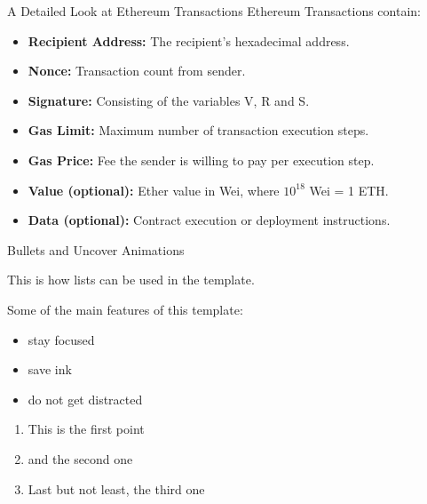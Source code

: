 \documentclass[handout]{beamer}
\begin{document}
\begin{frame}{A Detailed Look at Ethereum Transactions}
Ethereum Transactions contain:
	\begin{itemize}
		\item<1-> \textbf{Recipient Address:} The recipient's hexadecimal 		address.
		\item<2-> \textbf{Nonce:} Transaction count from sender.
		\item<3-> \textbf{Signature:} Consisting of the variables V, R and S.
		\item<4-> \textbf{Gas Limit:} Maximum number of transaction execution steps.
		\item<5-> \textbf{Gas Price:} Fee the sender is willing to pay per execution step. 
		\item<6-> \textbf{Value (optional):} Ether value in Wei, where $10^{18}$ Wei = 1 ETH. 
		\item<7-> \textbf{Data (optional):} Contract execution or deployment instructions.
	\end{itemize}

\end{frame}


















\begin{frame}{Bullets and Uncover Animations}

This is how lists can be used in the template. \\ \vspace{1em}

Some of the main features of this template:
	
	\begin{itemize}
		\item<1-> stay focused
		\item<2-> save ink
		\item<3-> do not get distracted
	\end{itemize}

	\vspace{1em}	

	\begin{enumerate}
		\item<5-> This is the first point
		\item<6-> and the second one
		\item<7-> Last but not least, the third one
	\end{enumerate}
	
\end{frame}
\end{document}
